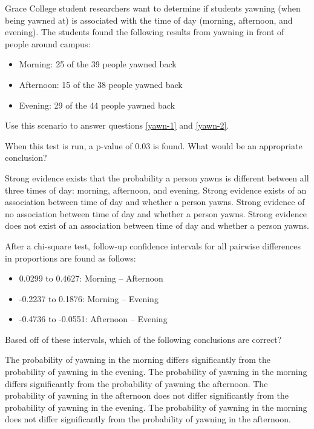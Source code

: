 \documentclass{article}
\begin{document}
\begin{mcquestions}
		\begin{mcquestioninstruction}
			Grace College student researchers want to determine if students yawning (when being yawned at) is associated with the time of day (morning, afternoon, and evening). The students found the following results from yawning in front of people around campus:
			\begin{itemize}
				\item Morning: 25 of the 39 people yawned back
				\item Afternoon: 15 of the 38 people yawned back
				\item Evening: 29 of the 44 people yawned back
			\end{itemize}
			Use this scenario to answer questions \ref{yawn-1} and \ref{yawn-2}.
		\end{mcquestioninstruction}
		\question When this test is run, a p-value of 0.03 is found. What would be an appropriate conclusion? \label{yawn-1}
		\begin{mcanswerslist}
			\answer Strong evidence exists that the probability a person yawns is different between all three times of day: morning, afternoon, and evening.
			\answer[correct] Strong evidence exists of an association between time of day and whether a person yawns.
			\answer Strong evidence of no association between time of day and whether a person yawns.
			\answer Strong evidence does not exist of an association between time of day and whether a person yawns.
		\end{mcanswerslist}
		
		\question[follow] After a chi-square test, follow-up confidence intervals for all pairwise differences in proportions are found as follows: \label{yawn-2}
		\begin{itemize}
			\item 0.0299 to 0.4627:  Morning – Afternoon
			\item -0.2237 to 0.1876:  Morning – Evening
			\item -0.4736 to -0.0551:  Afternoon – Evening
		\end{itemize}
		Based off of these intervals, which of the following conclusions are correct?
		\begin{mcanswerslist}
			\answer The probability of yawning in the morning differs significantly from the probability of yawning in the evening.
			\answer[correct] The probability of yawning in the morning differs significantly from the probability of yawning the afternoon.
			\answer The probability of yawning in the afternoon does not differ significantly from the probability of yawning in the evening.
			\answer The probability of yawning in the morning does not differ significantly from the probability of yawning in the afternoon.
		\end{mcanswerslist}
		

\end{mcquestions}
\end{document}
